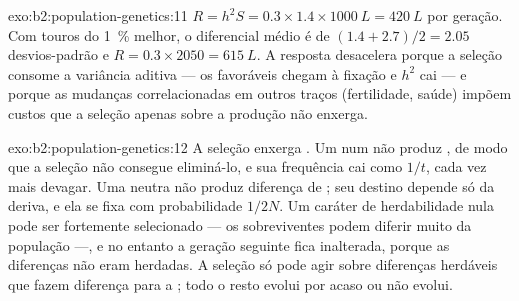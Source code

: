 \begin{solution}{exo:b2:population-genetics:11}
$R = h^{2}S = 0.3\times 1.4\times \qty{1000}{L} = \qty{420}{L}$ por
geração. Com touros do \qty{1}{\%} melhor, o diferencial médio é de
$(1.4 + 2.7)/2 = 2.05$ desvios-padrão e $R =
0.3\times 2050 = \qty{615}{L}$. A resposta desacelera porque a seleção
consome a variância aditiva --- os  favoráveis chegam à fixação e
$h^{2}$ cai --- e porque as mudanças correlacionadas em outros traços
(fertilidade, saúde) impõem custos que a seleção apenas sobre a produção
não enxerga.
\end{solution}

\begin{solution}{exo:b2:population-genetics:12}
A seleção enxerga . Um   num  não
produz , de modo que a seleção não consegue eliminá-lo, e sua
frequência cai como $1/t$, cada vez mais devagar. Uma  neutra não
produz diferença de ; seu destino depende só da deriva, e ela se
fixa com probabilidade $1/2N$. Um caráter de herdabilidade nula pode ser
fortemente selecionado --- os sobreviventes podem diferir muito da
população ---, e no entanto a geração seguinte fica inalterada, porque as
diferenças não eram herdadas. A seleção só pode agir sobre diferenças
herdáveis que fazem diferença para a ; todo o resto evolui por
acaso ou não evolui.
\end{solution}

